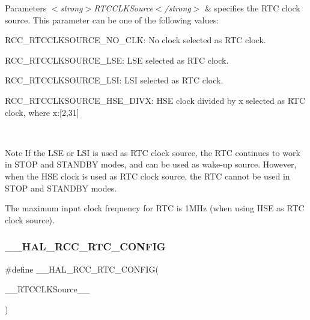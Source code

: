 \begin{DoxyParams}{Parameters}
{\em $<$strong$>$\+R\+T\+C\+C\+L\+K\+Source$<$/strong$>$} & specifies the R\+TC clock source. This parameter can be one of the following values\+: \begin{DoxyItemize}
\item R\+C\+C\+\_\+\+R\+T\+C\+C\+L\+K\+S\+O\+U\+R\+C\+E\+\_\+\+N\+O\+\_\+\+C\+L\+K\+: No clock selected as R\+TC clock. \item R\+C\+C\+\_\+\+R\+T\+C\+C\+L\+K\+S\+O\+U\+R\+C\+E\+\_\+\+L\+S\+E\+: L\+SE selected as R\+TC clock. \item R\+C\+C\+\_\+\+R\+T\+C\+C\+L\+K\+S\+O\+U\+R\+C\+E\+\_\+\+L\+S\+I\+: L\+SI selected as R\+TC clock. \item R\+C\+C\+\_\+\+R\+T\+C\+C\+L\+K\+S\+O\+U\+R\+C\+E\+\_\+\+H\+S\+E\+\_\+\+D\+I\+V\+X\+: H\+SE clock divided by x selected as R\+TC clock, where x\+:\mbox{[}2,31\mbox{]} \end{DoxyItemize}
\\
\hline
\end{DoxyParams}
\begin{DoxyNote}{Note}
If the L\+SE or L\+SI is used as R\+TC clock source, the R\+TC continues to work in S\+T\+OP and S\+T\+A\+N\+D\+BY modes, and can be used as wake-\/up source. However, when the H\+SE clock is used as R\+TC clock source, the R\+TC cannot be used in S\+T\+OP and S\+T\+A\+N\+D\+BY modes. 

The maximum input clock frequency for R\+TC is 1\+M\+Hz (when using H\+SE as R\+TC clock source). 
\end{DoxyNote}
\mbox{\label{group___r_c_c___internal___r_t_c___clock___configuration_ga2b1e5349631886f29040d7a31c002718}} 
\subsubsection{\texorpdfstring{\+\_\+\+\_\+\+H\+A\+L\+\_\+\+R\+C\+C\+\_\+\+R\+T\+C\+\_\+\+C\+O\+N\+F\+IG}{\_\_HAL\_RCC\_RTC\_CONFIG}}
{\footnotesize\ttfamily \#define \+\_\+\+\_\+\+H\+A\+L\+\_\+\+R\+C\+C\+\_\+\+R\+T\+C\+\_\+\+C\+O\+N\+F\+IG(\begin{DoxyParamCaption}\item[{}]{\+\_\+\+\_\+\+R\+T\+C\+C\+L\+K\+Source\+\_\+\+\_\+ }\end{DoxyParamCaption})}

